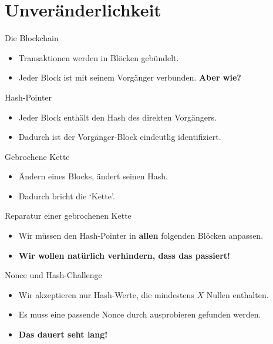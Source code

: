 \documentclass[aspectratio=169]{beamer}
\begin{document}
\section{Unveränderlichkeit}

\begin{frame}{Die Blockchain}
    \begin{itemize}
        \item Transaktionen werden in Blöcken gebündelt.
        \item Jeder Block ist mit seinem Vorgänger verbunden.
        \pause
        \textbf{Aber wie?}
    \end{itemize}
\end{frame}


\begin{frame}{Hash-Pointer}
    \begin{itemize}
        \item Jeder Block enthält den Hash des direkten Vorgängers.
        \item Dadurch ist der Vorgänger-Block eindeutlig identifiziert.
    \end{itemize}
\end{frame}


\begin{frame}{Gebrochene Kette}
    \begin{itemize}
        \item Ändern eines Blocks, ändert seinen Hash.
        \item Dadurch bricht die `Kette'.
    \end{itemize}
\end{frame}


\begin{frame}{Reparatur einer gebrochenen Kette}
    \begin{itemize}
        \item Wir müssen den Hash-Pointer in \textbf{allen} folgenden Blöcken anpassen.
        \pause
        \item \textbf{Wir wollen natürlich verhindern, dass das passiert!}
    \end{itemize}
\end{frame}


\begin{frame}{Nonce und Hash-Challenge}
    \begin{itemize}
        \item Wir akzeptieren nur Hash-Werte, die mindestens $X$ Nullen enthalten.
        \item Es muss eine passende Nonce durch ausprobieren gefunden werden.
        \item \textbf{Das dauert seht lang!}
    \end{itemize}
\end{frame}
\end{document}
